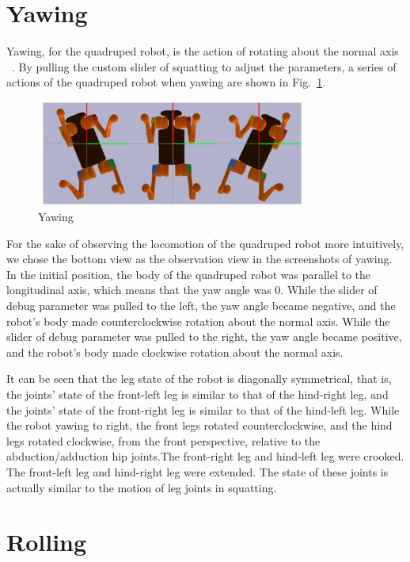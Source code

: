 \section{Yawing}

Yawing, for the quadruped robot, is the action of rotating about the normal axis ~\cite{ref:6DOF}. By pulling the custom slider of squatting to adjust the parameters, a series of actions of the quadruped robot when yawing are shown in Fig.~\ref{fig: yawing}.

\begin{figure}[htbp]
    \centering
    \includegraphics[width=0.8\textwidth]{figures/yawing.png}
    \caption{Yawing}
    \label{fig: yawing}
\end{figure}


For the sake of observing the locomotion of the quadruped robot more intuitively, we chose the bottom view as the observation view in the screenshots of yawing. In the initial position, the body of the quadruped robot was parallel to the longitudinal axis, which means that the yaw angle was 0. While the slider of debug parameter was pulled to the left, the yaw angle became negative, and the robot's body made counterclockwise rotation about the normal axis. While the slider of debug parameter was pulled to the right, the yaw angle became positive, and the robot's body made clockwise rotation about the normal axis.

It can be seen that the leg state of the robot is diagonally symmetrical, that is, the joints' state of the front-left leg is similar to that of the hind-right leg, and the joints' state of the front-right leg is similar to that of the hind-left leg. While the robot yawing to right, the front legs rotated counterclockwise, and the hind legs rotated clockwise, from the front perspective, relative to the abduction/adduction hip joints.The front-right leg and hind-left leg were crooked. The front-left leg and hind-right leg were extended. The state of these joints is actually similar to the motion of leg joints in squatting.


\section{Rolling}

